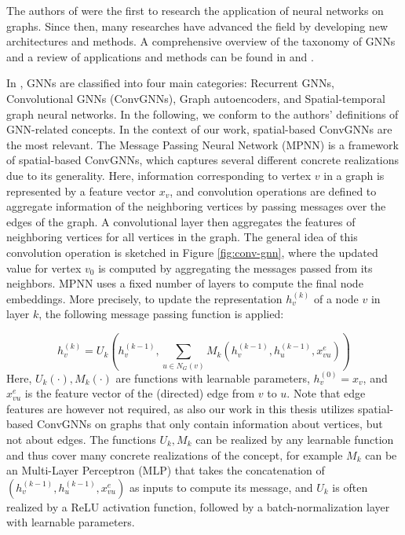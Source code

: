 \documentclass[draft,final]{vutinfth} %
\begin{document}
The authors of \cite{Sperduti1997} were the first to research the application of neural networks on graphs. Since then, many researches have advanced the field by developing new architectures and methods. 
A comprehensive overview of the taxonomy of GNNs and a review of applications and methods can be found in \cite{Wu2019} and \cite{Zhou2020}. 

In \cite{Wu2019}, GNNs are classified into four main categories: Recurrent GNNs, Convolutional GNNs (ConvGNNs), Graph autoencoders, and Spatial-temporal graph neural networks. In the following, we conform to the authors' definitions of GNN-related concepts. 
In the context of our work, spatial-based ConvGNNs are the most relevant. 
The Message Passing Neural Network (MPNN) \cite{GilmerSRVD17} is a framework of spatial-based ConvGNNs, which captures several different concrete realizations due to its generality. 
Here, information corresponding to vertex $v$ in a graph is represented by a feature vector $x_v$, and convolution operations are defined to aggregate information of the neighboring vertices by passing messages over the edges of the graph. A convolutional layer then aggregates the features of neighboring vertices for all vertices in the graph. The general idea of this convolution operation is sketched in Figure \ref{fig:conv-gnn}, 
where the updated value for vertex $v_0$ is computed by aggregating the messages passed from its neighbors. MPNN uses a fixed number of layers to compute the final node embeddings. 
More precisely, to update the representation $h_v^{(k)}$ of a node $v$ in layer $k$, the following message passing function is applied: 

\[
    h_v^{(k)} = U_k (h_v^{(k-1)}, \sum_{u \in N_G(v)} M_k(h_v^{(k-1)}, h_u^{(k-1)}, x_{vu}^{e}))
\]
Here, $U_k(\cdot), M_k(\cdot)$ are functions with learnable parameters, $h_v^{(0)} = x_v$, and $x_{vu}^{e}$ is the feature vector of the (directed) edge from $v$ to $u$. Note that edge features are however not required, as also our work in this thesis utilizes spatial-based ConvGNNs on graphs that only contain information about vertices, but not about edges. 
The functions $U_k, M_k$ can be realized by any learnable function and thus cover many concrete realizations of the concept, for example $M_k$ can be an Multi-Layer Perceptron (MLP) that takes the concatenation of $(h_v^{(k-1)}, h_u^{(k-1)}, x_{vu}^{e})$ as inputs to compute its message, and $U_k$ is often realized by a ReLU activation function, followed by a batch-normalization \cite{IoffeS15} layer with learnable parameters. 
\end{document}
